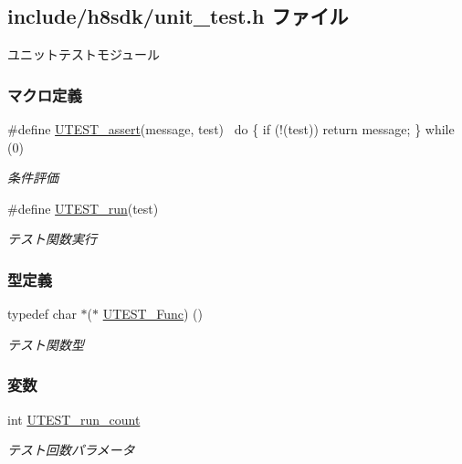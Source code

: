 \subsection{include/h8sdk/unit\+\_\+test.h ファイル}
\label{unit__test_8h}


ユニットテストモジュール  


\subsubsection*{マクロ定義}
\begin{DoxyCompactItemize}
\item 
\#define \hyperlink{unit__test_8h_a43398eef18d5cba509bb5f3db3ee8ca0_a43398eef18d5cba509bb5f3db3ee8ca0}{U\+T\+E\+S\+T\+\_\+assert}(message,  test)                              ~do \{ if (!(test)) return message; \} while (0)
\begin{DoxyCompactList}\small\item\em 条件評価 \end{DoxyCompactList}\item 
\#define \hyperlink{unit__test_8h_a264adea8243e5b630fba52f2eb0f3b89_a264adea8243e5b630fba52f2eb0f3b89}{U\+T\+E\+S\+T\+\_\+run}(test)                                                      
\begin{DoxyCompactList}\small\item\em テスト関数実行 \end{DoxyCompactList}\end{DoxyCompactItemize}
\subsubsection*{型定義}
\begin{DoxyCompactItemize}
\item 
typedef char $\ast$($\ast$ \hyperlink{unit__test_8h_ab45728c52edb48f928e7c19aaaa52eec_ab45728c52edb48f928e7c19aaaa52eec}{U\+T\+E\+S\+T\+\_\+\+Func}) ()
\begin{DoxyCompactList}\small\item\em テスト関数型 \end{DoxyCompactList}\end{DoxyCompactItemize}
\subsubsection*{変数}
\begin{DoxyCompactItemize}
\item 
int \hyperlink{unit__test_8h_acd7569f2b3fd36e6f3b47850e36ccdb0_acd7569f2b3fd36e6f3b47850e36ccdb0}{U\+T\+E\+S\+T\+\_\+run\+\_\+count}
\begin{DoxyCompactList}\small\item\em テスト回数パラメータ \end{DoxyCompactList}\end{DoxyCompactItemize}


